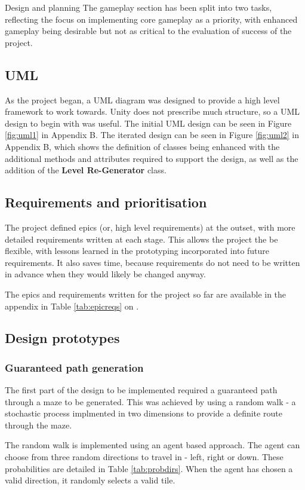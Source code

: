 \documentclass[progress]{cmpreport}
\begin{document}
\begin{section}{Design and planning}
The gameplay section has been split into two tasks, reflecting the focus on implementing core gameplay as a priority, with enhanced gameplay being desirable but not as critical to the evaluation of success of the project.


\subsection{UML}

As the project began, a UML diagram was designed to provide a high level framework to work towards. Unity does not prescribe much structure, so a UML design to begin with was useful. The initial UML design can be seen in Figure \ref{fig:uml1} in Appendix B. The iterated design can be seen in Figure \ref{fig:uml2} in Appendix B, which shows the definition of classes being enhanced with the additional methods and attributes required to support the design, as well as the addition of the \textbf{Level Re-Generator} class.


\subsection{Requirements and prioritisation}

The project defined epics (or, high level requirements) at the outset, with more detailed requirements written at each stage. This allows the project the be flexible, with lessons learned in the prototyping incorporated into future requirements. It also saves time, because requirements do not need to be written in advance when they would likely be changed anyway.

The epics and requirements written for the project so far are available in the appendix in Table \ref{tab:epicreqs} on \pageref{tab:epicreqs}.


\subsection{Design prototypes}
\subsubsection{Guaranteed path generation}
The first part of the design to be implemented required a guaranteed path through a maze to be generated. This was achieved by using a random walk - a stochastic process implmented in two dimensions to provide a definite route through the maze.

The random walk is implemented using an agent based approach. The agent can choose from three random directions to travel in - left, right or down. These probabilities are detailed in Table \ref{tab:probdirs}. When the agent has chosen a valid direction, it randomly selects a valid tile. 


\end{section}
\end{document}

